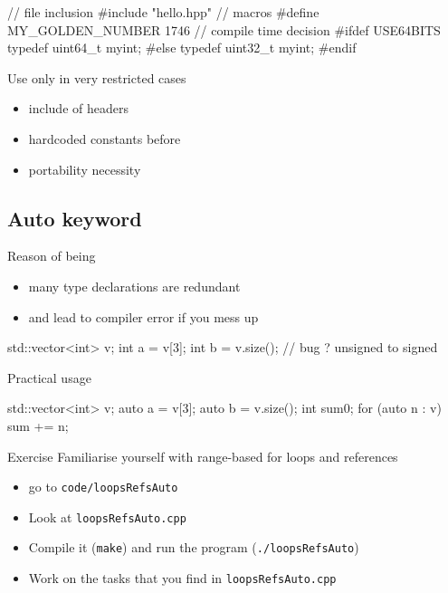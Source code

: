 \begin{frame}[fragile]
  \begin{cppcode}
    // file inclusion
    #include "hello.hpp"
    // macros
    #define MY_GOLDEN_NUMBER 1746
    // compile time decision
    #ifdef USE64BITS
      typedef uint64_t myint;
    #else
      typedef uint32_t myint;
    #endif
  \end{cppcode}
  \pause
  \begin{block}{Use only in very restricted cases}
    \begin{itemize}
    \item include of headers
    \item hardcoded constants before 
    \item portability necessity
    \end{itemize}
  \end{block}
\end{frame}
\subsection[auto]{Auto keyword}

\begin{frame}[fragile]
  \begin{block}{Reason of being}
    \begin{itemize}
    \item many type declarations are redundant
    \item and lead to compiler error if you mess up
    \end{itemize}
    \begin{cppcode*}{}
      std::vector<int> v;
      int a = v[3];
      int b = v.size();  // bug ? unsigned to signed
    \end{cppcode*}
  \end{block}
  \pause
  \begin{block}{Practical usage}
    \begin{cppcode*}{}
      std::vector<int> v;
      auto a = v[3];
      auto b = v.size();
      int sum{0};
      for (auto n : v) { sum += n; }
    \end{cppcode*}
  \end{block}
\end{frame}

\begin{frame}[fragile]
  \begin{alertblock}{Exercise}
    Familiarise yourself with range-based for loops and references
    \begin{itemize}
      \item go to \texttt{code/loopsRefsAuto}
      \item Look at \texttt{loopsRefsAuto.cpp}
      \item Compile it (\texttt{make}) and run the program (\texttt{./loopsRefsAuto})
      \item Work on the tasks that you find in \texttt{loopsRefsAuto.cpp}
    \end{itemize}
  \end{alertblock}
\end{frame}

